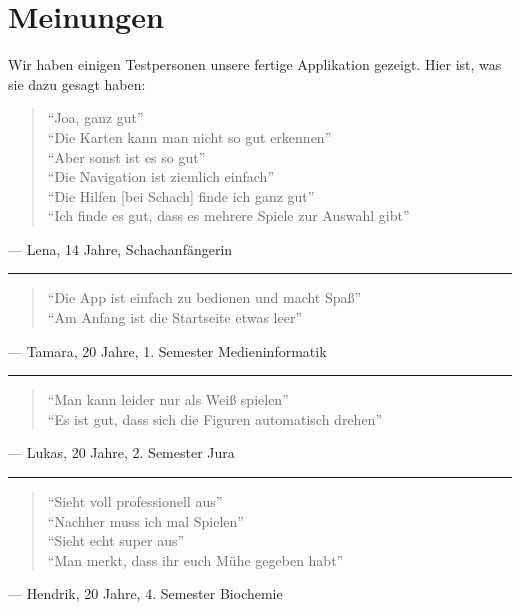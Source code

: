 \section{Meinungen}

Wir haben einigen Testpersonen unsere fertige Applikation gezeigt. Hier ist, was
sie dazu gesagt haben:

\begin{quote}
``Joa, ganz gut'' \\
``Die Karten kann man nicht so gut erkennen'' \\
``Aber sonst ist es so gut'' \\
``Die Navigation ist ziemlich einfach'' \\
``Die Hilfen [bei Schach] finde ich ganz gut'' \\
``Ich finde es gut, dass es mehrere Spiele zur Auswahl gibt''
\end{quote}
--- Lena, 14 Jahre, Schachanfängerin

\hspace{8mm}\rule{.1\textwidth}{0.5pt}
\begin{quote}
``Die App ist einfach zu bedienen und macht Spaß'' \\
``Am Anfang ist die Startseite etwas leer''
\end{quote}
--- Tamara, 20 Jahre, 1. Semester Medieninformatik

\hspace{8mm}\rule{.1\textwidth}{0.5pt}
\begin{quote}
``Man kann leider nur als Weiß spielen'' \\
``Es ist gut, dass sich die Figuren automatisch drehen''
\end{quote}
--- Lukas, 20 Jahre, 2. Semester Jura

\hspace{8mm}\rule{.1\textwidth}{0.5pt}
\begin{quote}
``Sieht voll professionell aus'' \\
``Nachher muss ich mal Spielen'' \\
``Sieht echt super aus'' \\
``Man merkt, dass ihr euch Mühe gegeben habt''
\end{quote}
--- Hendrik, 20 Jahre, 4. Semester Biochemie
